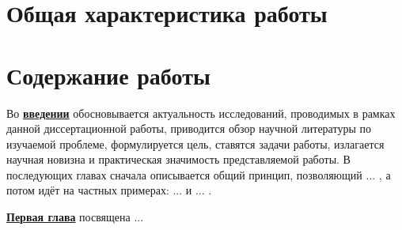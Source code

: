 
\section*{Общая характеристика работы}

\newcommand{\actuality}{\underline{\textbf{\actualityTXT}}}
\newcommand{\progress}{\underline{\textbf{\progressTXT}}}
\newcommand{\aim}{\underline{{\textbf\aimTXT}}}
\newcommand{\tasks}{\underline{\textbf{\tasksTXT}}}
\newcommand{\novelty}{\underline{\textbf{\noveltyTXT}}}
\newcommand{\influence}{\underline{\textbf{\influenceTXT}}}
\newcommand{\methods}{\underline{\textbf{\methodsTXT}}}
\newcommand{\defpositions}{\underline{\textbf{\defpositionsTXT}}}
\newcommand{\reliability}{\underline{\textbf{\reliabilityTXT}}}
\newcommand{\probation}{\underline{\textbf{\probationTXT}}}
\newcommand{\contribution}{\underline{\textbf{\contributionTXT}}}
\newcommand{\publications}{\underline{\textbf{\publicationsTXT}}}




\section*{Содержание работы}
Во \underline{\textbf{введении}} обосновывается актуальность
исследований, проводимых в рамках данной диссертационной работы,
приводится обзор научной литературы по изучаемой проблеме,
формулируется цель, ставятся задачи работы, излагается научная новизна
и практическая значимость представляемой работы. В последующих главах
сначала описывается общий принцип, позволяющий ... , а потом идёт
 на частных примерах: ...  и ... .


\underline{\textbf{Первая глава}} посвящена ...


